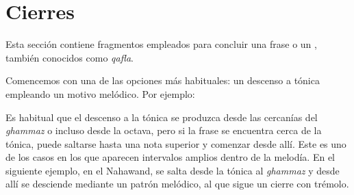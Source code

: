 
\newbeginning{}

\begin{center}
\end{center}


\newbeginning{}

\begin{center}
\end{center}


\section{Cierres}

Esta sección contiene fragmentos empleados para concluir una frase o un \taqsimb, también conocidos como \emph{qafla}.

Comencemos con una de las opciones más habituales: un descenso a tónica empleando un motivo melódico. Por ejemplo:


\begin{center}
\end{center}



Es habitual que el descenso a la tónica se produzca desde las cercanías del \emph{ghammaz} o incluso desde la octava, pero si la frase se encuentra cerca de la tónica, puede saltarse hasta una nota superior y comenzar desde allí. Este es uno de los casos en los que aparecen intervalos amplios dentro de la melodía. En el siguiente ejemplo, en el \maqam Nahawand, se salta desde la tónica al \emph{ghammaz} y desde allí se desciende mediante un patrón melódico, al que sigue un cierre con trémolo.


